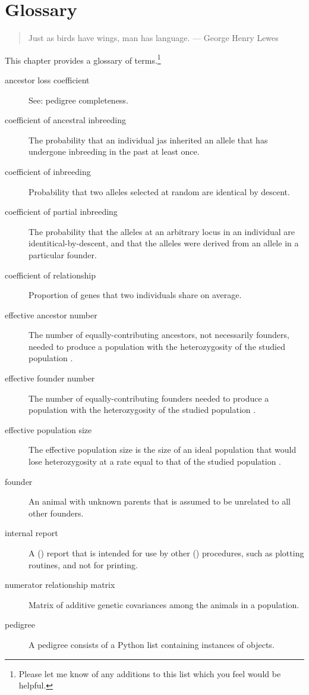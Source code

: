 \chapter{Glossary}
\label{cha:glossary}
\begin{quote}
Just as birds have wings, man has language. --- George Henry Lewes
\end{quote}
This chapter provides a glossary of terms.\footnote{Please let me know of any additions to this list which you feel would be helpful.}
\begin{description}
\item[ancestor loss coefficient] See: pedigree completeness.
\item[coefficient of ancestral inbreeding] The probability that an individual jas inherited an allele that has undergone inbreeding in the past at least once.
\item[coefficient of inbreeding] Probability that two alleles selected at random are identical by descent.
\item[coefficient of partial inbreeding] The probability that the alleles at an arbitrary locus in an individual are identitical-by-descent, and that the alleles were derived from an allele in a particular founder.
\item[coefficient of relationship] Proportion of genes that two individuals share on average.
\item[effective ancestor number] The number of equally-contributing ancestors, not necessarily founders, needed to produce a population with the heterozygosity of the studied population \cite{ref352}.
\item[effective founder number] The number of equally-contributing founders needed to produce a population with the heterozygosity of the studied population \cite{ref640}.
\item[effective population size] The effective population size is the size of an ideal population that would lose heterozygosity at a rate equal to that of the studied population \cite{ref91}.
\item[founder] An animal with unknown parents that is assumed to be unrelated to all other founders.
\item[internal report] A \PyPedal() report that is intended for use by other \PyPedal() procedures, such as plotting
routines, and not for printing.
\item[numerator relationship matrix] Matrix of additive genetic covariances among the animals in a population.
\item[pedigree] A \PyPedal{} pedigree consists of a Python list containing instances of \PyPedal{}  objects.

\end{description}
